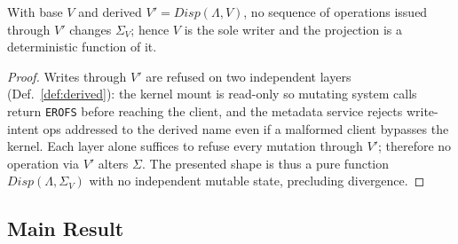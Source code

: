 \documentclass[numberedsection,acmtos]{acmart}
\begin{document}
\begin{lemma}\label{lem:derived}
With base $V$ and derived $V'=\mathit{Disp}(\Lambda,V)$, no sequence of
operations issued through $V'$ changes $\Sigma_V$; hence $V$ is the sole writer
and the projection is a deterministic function of it.
\end{lemma}
\begin{proof}
Writes through $V'$ are refused on two independent layers (Def.~\ref{def:derived}):
the kernel mount is read-only so mutating system calls return \texttt{EROFS}
before reaching the client, and the metadata service rejects write-intent ops
addressed to the derived name even if a malformed client bypasses the kernel.
Each layer alone suffices to refuse every mutation through $V'$; therefore no
operation via $V'$ alters $\Sigma$.
The presented shape is thus a pure function $\mathit{Disp}(\Lambda,\Sigma_V)$
with no independent mutable state, precluding divergence.
\end{proof}

\subsection{Main Result}\label{sec:theorem}
\end{document}
